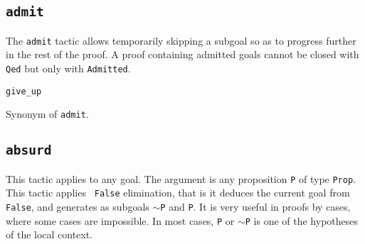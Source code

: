 \begin{coq_example*}

\subsection{\tt admit}
\label{admit}

The {\tt admit} tactic allows temporarily skipping a subgoal so as to
progress further in the rest of the proof.  A proof containing
admitted goals cannot be closed with {\tt Qed} but only with
{\tt Admitted}.

\begin{Variants}

  \item {\tt give\_up}

    Synonym of {\tt admit}.

\end{Variants}

\subsection{\tt absurd \term}
\label{absurd}

This tactic applies to any goal. The argument {\term} is any
proposition {\tt P} of type {\tt Prop}. This tactic applies {\tt
  False} elimination, that is it deduces the current goal from {\tt
  False}, and generates as subgoals {\tt $\sim$P} and {\tt P}. It is
very useful in proofs by cases, where some cases are impossible. In
most cases, \texttt{P} or $\sim$\texttt{P} is one of the hypotheses of
the local context.


\end{coq_example*}
